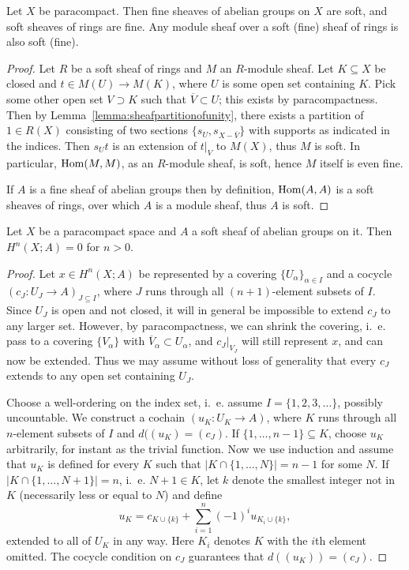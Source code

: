 \documentclass[a4paper,openany]{scrbook}
\begin{document}
\begin{prop}\label{prop:finesoftsheaves}
Let $X$ be paracompact. Then fine sheaves of abelian groups on $X$ are soft, and soft sheaves of rings are fine. Any module sheaf over a soft (fine) sheaf of rings is also soft (fine).
\end{prop}
\begin{proof}
Let $R$ be a soft sheaf of rings and $M$ an $R$-module sheaf. Let $K \subseteq X$ be closed and $t \in M(U) \to M(K)$, where $U$ is some open set containing $K$. Pick some other open set $V \supset K$ such that $\overline V \subset U$; this exists by paracompactness. Then by Lemma~\ref{lemma:sheafpartitionofunity}, there exists a partition of $1 \in R(X)$ consisting of two sections $\{s_U,s_{X-\overline V}\}$ with supports as indicated in the indices. Then $s_U t$ is an extension of $t|_V$ to $M(X)$, thus $M$ is soft. In particular, $\operatorname{Hom}(M,M)$, as an $R$-module sheaf, is soft, hence $M$ itself is even fine.

If $A$ is a fine sheaf of abelian groups then by definition, $\operatorname{Hom}(A,A)$ is a soft sheaves of rings, over which $A$ is a module sheaf, thus $A$ is soft.
\end{proof}

\begin{prop}\label{prop:finesheafcohomology}
Let $X$ be a paracompact space and $A$ a soft sheaf of abelian groups on it. Then $H^n(X;A)=0$ for $n>0$.
\end{prop}
\begin{proof}
Let $x \in H^n(X;A)$ be represented by a covering $\{U_\alpha\}_{\alpha \in I}$ and a cocycle $(c_J\colon U_J \to A)_{J \subseteq I}$, where $J$ runs through all $(n+1)$-element subsets of $I$. Since $U_J$ is open and not closed, it will in general be impossible to extend $c_J$ to any larger set. However, by paracompactness, we can shrink the covering, i.~e. pass to a covering $\{V_\alpha\}$ with $\overline V_\alpha \subset U_\alpha$, and $c_J|_{V_J}$ will still represent $x$, and can now be extended. Thus we may assume without loss of generality that every $c_J$ extends to any open set containing $U_J$.

Choose a well-ordering on the index set, i.~e. assume $I=\{1,2,3,\dots\}$, possibly uncountable. We construct a cochain $(u_K\colon U_K \to A)$, where $K$ runs through all $n$-element subsets of $I$ and $d((u_K) = (c_J)$. If $\{1,\dots,n-1\} \subseteq K$, choose $u_K$ arbitrarily, for instant as the trivial function. Now we use induction and assume that $u_K$ is defined for every $K$ such that $|K \cap \{1,\dots,N\}| = n-1$ for some $N$. If $|K \cap \{1,\dots,N+1\}| = n$, i.~e. $N+1 \in K$, let $k$ denote the smallest integer not in $K$ (necessarily less or equal to $N$) and define
\[
u_K = c_{K\cup\{k\}}+\sum_{i=1}^{n} (-1)^i u_{K_i \cup \{k\}},
\]
extended to all of $U_K$ in any way. Here $K_i$ denotes $K$ with the $i$th element omitted. The cocycle condition on $c_J$ guarantees that $d((u_K))=(c_J)$.
\end{proof}
\end{document}
